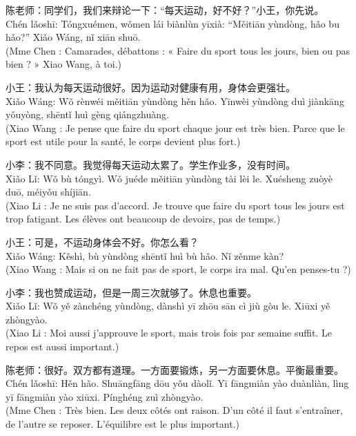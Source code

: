 \documentclass[11pt]{article}
\begin{document}
\begin{textebox}
陈老师：同学们，我们来辩论一下：“每天运动，好不好？”小王，你先说。\\
Chén lǎoshī: Tóngxuémen, wǒmen lái biànlùn yīxià: “Měitiān yùndòng, hǎo bu hǎo?” Xiǎo Wáng, nǐ xiān shuō.\\
(Mme Chen : Camarades, débattons : « Faire du sport tous les jours, bien ou pas bien ? » Xiao Wang, à toi.)

小王：我认为每天运动很好。因为运动对健康有用，身体会更强壮。\\
Xiǎo Wáng: Wǒ rènwéi měitiān yùndòng hěn hǎo. Yīnwèi yùndòng duì jiànkāng yǒuyòng, shēntǐ huì gèng qiángzhuàng.\\
(Xiao Wang : Je pense que faire du sport chaque jour est très bien. Parce que le sport est utile pour la santé, le corps devient plus fort.)

小李：我不同意。我觉得每天运动太累了。学生作业多，没有时间。\\
Xiǎo Lǐ: Wǒ bù tóngyì. Wǒ juéde měitiān yùndòng tài lèi le. Xuésheng zuòyè duō, méiyǒu shíjiān.\\
(Xiao Li : Je ne suis pas d'accord. Je trouve que faire du sport tous les jours est trop fatigant. Les élèves ont beaucoup de devoirs, pas de temps.)

小王：可是，不运动身体会不好。你怎么看？\\
Xiǎo Wáng: Kěshì, bù yùndòng shēntǐ huì bù hǎo. Nǐ zěnme kàn?\\
(Xiao Wang : Mais si on ne fait pas de sport, le corps ira mal. Qu'en penses-tu ?)

小李：我也赞成运动，但是一周三次就够了。休息也重要。\\
Xiǎo Lǐ: Wǒ yě zànchéng yùndòng, dànshì yī zhōu sān cì jiù gòu le. Xiūxi yě zhòngyào.\\
(Xiao Li : Moi aussi j'approuve le sport, mais trois fois par semaine suffit. Le repos est aussi important.)

陈老师：很好。双方都有道理。一方面要锻炼，另一方面要休息。平衡最重要。\\
Chén lǎoshī: Hěn hǎo. Shuāngfāng dōu yǒu dàolǐ. Yī fāngmiàn yào duànliàn, lìng yī fāngmiàn yào xiūxi. Pínghéng zuì zhòngyào.\\
(Mme Chen : Très bien. Les deux côtés ont raison. D'un côté il faut s'entraîner, de l'autre se reposer. L'équilibre est le plus important.)
\end{textebox}
\end{document}
